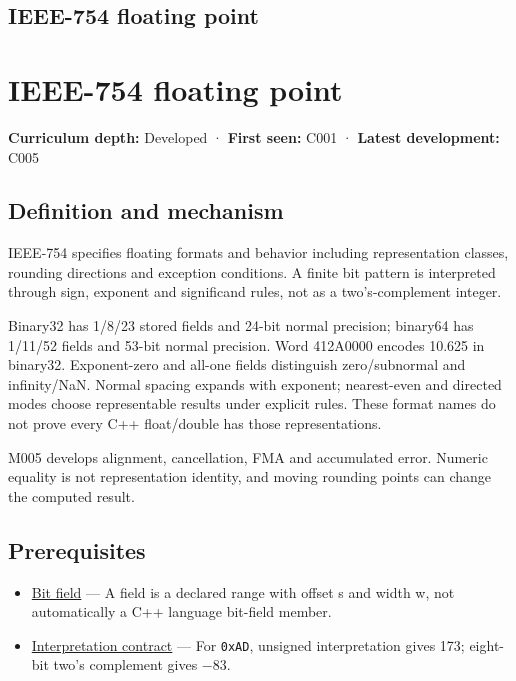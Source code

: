 \hypertarget{appendix-343615f49ddf}{}
\section*{IEEE-754 floating point}
\chapter{IEEE-754 floating point}\label{appendix-343615f49ddf-ieee-754-floating-point}

\textbf{Curriculum depth:} Developed · \textbf{First seen:} C001 · \textbf{Latest development:} C005

\section{Definition and mechanism}\label{appendix-343615f49ddf-definition-and-mechanism}

IEEE-754 specifies floating formats and behavior including representation classes, rounding directions and exception conditions. A finite bit pattern is interpreted through sign, exponent and significand rules, not as a two's-complement integer.

Binary32 has 1/8/23 stored fields and 24-bit normal precision; binary64 has 1/11/52 fields and 53-bit normal precision. Word 412A0000 encodes 10.625 in binary32. Exponent-zero and all-one fields distinguish zero/subnormal and infinity/NaN. Normal spacing expands with exponent; nearest-even and directed modes choose representable results under explicit rules. These format names do not prove every C++ float/double has those representations.

M005 develops alignment, cancellation, FMA and accumulated error. Numeric equality is not representation identity, and moving rounding points can change the computed result.

\section{Prerequisites}\label{appendix-343615f49ddf-prerequisites}

\begin{itemize}
\tightlist
\item
  \hyperref[appendix-ac697f5c66e8]{Bit field} --- A field is a declared range with offset s and width w, not automatically a C++ language bit-field member.
\item
  \hyperref[appendix-f414bd4ed05c]{Interpretation contract} --- For \texttt{0xAD}, unsigned interpretation gives 173; eight-bit two's complement gives −83.
\end{itemize}

